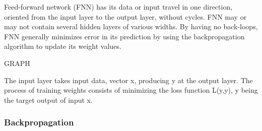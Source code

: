 Feed-forward network (FNN) has its data or input travel in one direction, oriented from the input layer to the output layer, without cycles.\cite{6typeann} FNN may or may not contain several hidden layers of various widths. By having no back-loops, FNN generally minimizes error in its prediction by using the backpropagation algorithm to update its weight values.\cite{mainTypesANN}

GRAPH

The input layer takes input data, vector x, producing y at the output layer. The process of training weights
 consists of minimizing the loss function L(y,y), y being the target output of input x.\cite{lipton2015critical}

\subsubsection{Backpropagation}

